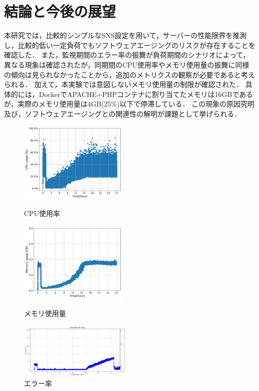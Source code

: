 \documentclass[twoside,twocolumn,10pt]{jarticle}  %
\begin{document}
\section{結論と今後の展望}
本研究では，比較的シンプルなSNS設定を用いて，サーバーの性能限界を推測し，比較的低い一定負荷でもソフトウェアエージングのリスクが存在することを確認した．
また，監視期間のエラー率の振舞が負荷期間のシナリオによって，異なる現象は確認されたが，同期間のCPU使用率やメモリ使用量の振舞に同様の傾向は見られなかったことから，追加のメトリクスの観察が必要であると考えられる．
加えて，本実験では意図しないメモリ使用量の制限が確認された．
具体的には，DockerでAPACHE$+$PHPコンテナに割り当てたメモリは16GBであるが，実際のメモリ使用量は4GB(25\%)以下で停滞している．
この現象の原因究明及び，ソフトウェアエージングとの関連性の解明が課題として挙げられる．\par
\begin{figure}[t]
  \centering
  \includegraphics[width=5.2cm]{figures/8core_1_15rps_increase_cpu.png}
  \vspace{-0.5cm}
  \caption{CPU使用率}
  \label{f1}

  \centering
  \includegraphics[width=5.2cm]{figures/8core_1_15rps_increase_mem.png}
  \vspace{-0.5cm}
  \caption{メモリ使用量}
  \label{f2}

  \centering
  \includegraphics[width=5.4cm]{figures/8core_1_15rps_error_rate.png}
  \vspace{-0.5cm}
  \caption{エラー率}
  \label{f3}
  \vspace{-0.5cm}
\end{figure}
\end{document}
